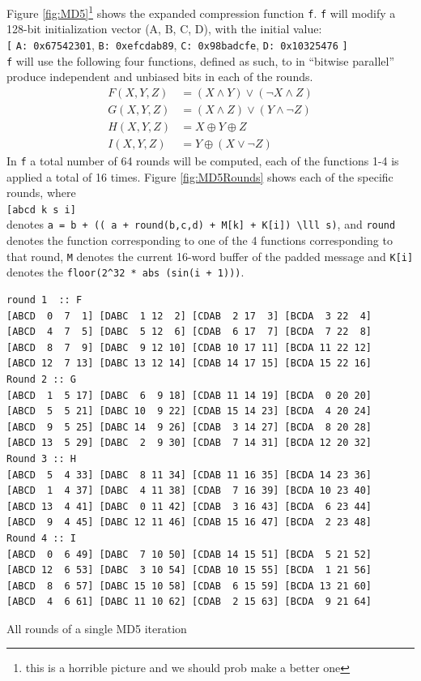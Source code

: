 \documentclass[a4paper]{article}
\begin{document}
Figure \ref{fig:MD5}\footnote{this is a horrible picture and we should prob make a better one} shows the expanded compression function \texttt{f}. \texttt{f} will modify a 128-bit initialization vector (A, B, C, D), with the initial value:\\
\texttt{[} \texttt{A: 0x67542301}, \texttt{B: 0xefcdab89}, \texttt{C: 0x98badcfe}, \texttt{D: 0x10325476} \texttt{]}\\
\texttt{f} will use the following four functions, defined as such, to in ``bitwise parallel'' produce independent and unbiased bits in each of the rounds.
\begin{align}
F(X, Y, Z) &= (X \wedge Y) \vee (\neg X \wedge Z) \\
G(X, Y, Z) &= (X \wedge Z) \vee (Y \wedge \neg Z) \\
H(X, Y, Z) &= X \oplus Y \oplus Z \\
I(X, Y, Z) &= Y \oplus ( X \vee \neg Z)
\end{align}
In \texttt{f} a total number of 64 rounds will be computed, each of the functions 1-4 is applied a total of 16 times. Figure \ref{fig:MD5Rounds} shows each of the specific rounds, where\\
\texttt{[abcd k s i]}\\
denotes \texttt{a = b + (( a + round(b,c,d) + M[k] + K[i]) \textbackslash{}lll s)}, and \texttt{round} denotes the function corresponding to one of the 4 functions corresponding to that round, \texttt{M} denotes the current 16-word buffer of the padded message and \texttt{K[i]} denotes the \texttt{floor(2\textasciicircum{}32 * abs (sin(i + 1)))}.
\begin{table}[!htb]
\centering
\begin{verbatim}
round 1  :: F
[ABCD  0  7  1] [DABC  1 12  2] [CDAB  2 17  3] [BCDA  3 22  4]
[ABCD  4  7  5] [DABC  5 12  6] [CDAB  6 17  7] [BCDA  7 22  8]
[ABCD  8  7  9] [DABC  9 12 10] [CDAB 10 17 11] [BCDA 11 22 12]
[ABCD 12  7 13] [DABC 13 12 14] [CDAB 14 17 15] [BCDA 15 22 16]
Round 2 :: G
[ABCD  1  5 17] [DABC  6  9 18] [CDAB 11 14 19] [BCDA  0 20 20]
[ABCD  5  5 21] [DABC 10  9 22] [CDAB 15 14 23] [BCDA  4 20 24]
[ABCD  9  5 25] [DABC 14  9 26] [CDAB  3 14 27] [BCDA  8 20 28]
[ABCD 13  5 29] [DABC  2  9 30] [CDAB  7 14 31] [BCDA 12 20 32]
Round 3 :: H
[ABCD  5  4 33] [DABC  8 11 34] [CDAB 11 16 35] [BCDA 14 23 36]
[ABCD  1  4 37] [DABC  4 11 38] [CDAB  7 16 39] [BCDA 10 23 40]
[ABCD 13  4 41] [DABC  0 11 42] [CDAB  3 16 43] [BCDA  6 23 44]
[ABCD  9  4 45] [DABC 12 11 46] [CDAB 15 16 47] [BCDA  2 23 48]
Round 4 :: I
[ABCD  0  6 49] [DABC  7 10 50] [CDAB 14 15 51] [BCDA  5 21 52]
[ABCD 12  6 53] [DABC  3 10 54] [CDAB 10 15 55] [BCDA  1 21 56]
[ABCD  8  6 57] [DABC 15 10 58] [CDAB  6 15 59] [BCDA 13 21 60]
[ABCD  4  6 61] [DABC 11 10 62] [CDAB  2 15 63] [BCDA  9 21 64]
\end{verbatim}
\caption{All rounds of a single MD5 iteration}
\label{fig:MD5Rounds}
\end{table}
\end{document}
